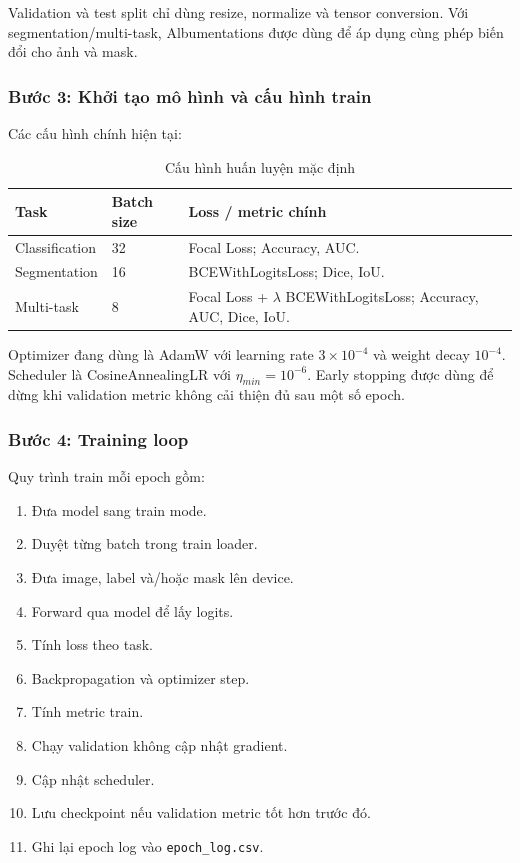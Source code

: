 \documentclass[12pt,a4paper]{article}
\begin{document}
Validation và test split chỉ dùng resize, normalize và tensor conversion. Với segmentation/multi-task, Albumentations được dùng để áp dụng cùng phép biến đổi cho ảnh và mask.

\subsubsection*{Bước 3: Khởi tạo mô hình và cấu hình train}

Các cấu hình chính hiện tại:

\begin{table}[H]
\centering
\caption{Cấu hình huấn luyện mặc định}
\renewcommand{\arraystretch}{1.25}
\begin{tabular}{p{4.4cm} p{4cm} p{6cm}}
\toprule
\textbf{Task} & \textbf{Batch size} & \textbf{Loss / metric chính} \\
\midrule
Classification & 32 & Focal Loss; Accuracy, AUC. \\
Segmentation & 16 & BCEWithLogitsLoss; Dice, IoU. \\
Multi-task & 8 & Focal Loss + \(\lambda\) BCEWithLogitsLoss; Accuracy, AUC, Dice, IoU. \\
\bottomrule
\end{tabular}
\end{table}

Optimizer đang dùng là AdamW với learning rate \(3 \times 10^{-4}\) và weight decay \(10^{-4}\). Scheduler là CosineAnnealingLR với \(\eta_{min}=10^{-6}\). Early stopping được dùng để dừng khi validation metric không cải thiện đủ sau một số epoch.

\subsubsection*{Bước 4: Training loop}

Quy trình train mỗi epoch gồm:

\begin{enumerate}
    \item Đưa model sang train mode.
    \item Duyệt từng batch trong train loader.
    \item Đưa image, label và/hoặc mask lên device.
    \item Forward qua model để lấy logits.
    \item Tính loss theo task.
    \item Backpropagation và optimizer step.
    \item Tính metric train.
    \item Chạy validation không cập nhật gradient.
    \item Cập nhật scheduler.
    \item Lưu checkpoint nếu validation metric tốt hơn trước đó.
    \item Ghi lại epoch log vào \texttt{epoch\_log.csv}.
\end{enumerate}
\end{document}
